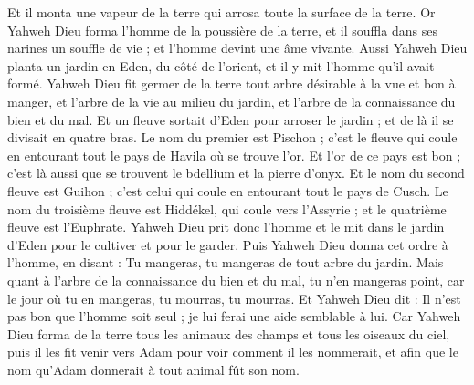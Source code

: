 \begin{multicols}{2}
Et il monta une vapeur de la terre qui arrosa toute la surface de la terre.
Or Yahweh Dieu forma l'homme de la poussière de la terre, et il souffla dans ses narines un souffle de vie ; et l'homme devint une âme vivante.
Aussi Yahweh Dieu planta un jardin en Eden, du côté de l'orient, et il y mit l'homme qu'il avait formé.
Yahweh Dieu fit germer de la terre tout arbre désirable à la vue et bon à manger, et l'arbre de la vie au milieu du jardin, et l'arbre de la connaissance du bien et du mal.
Et un fleuve sortait d'Eden pour arroser le jardin ; et de là il se divisait en quatre bras.
Le nom du premier est Pischon ; c'est le fleuve qui coule en entourant tout le pays de Havila où se trouve l'or.
Et l'or de ce pays est bon ; c'est là aussi que se trouvent le bdellium et la pierre d'onyx.
Et le nom du second fleuve est Guihon ; c'est celui qui coule en entourant tout le pays de Cusch.
Le nom du troisième fleuve est Hiddékel, qui coule vers l'Assyrie ; et le quatrième fleuve est l'Euphrate.
Yahweh Dieu prit donc l'homme et le mit dans le jardin d'Eden pour le cultiver et pour le garder.
Puis Yahweh Dieu donna cet ordre à l'homme, en disant : Tu mangeras, tu mangeras de tout arbre du jardin.
Mais quant à l'arbre de la connaissance du bien et du mal, tu n'en mangeras point, car le jour où tu en mangeras, tu mourras, tu mourras.
Et Yahweh Dieu dit : Il n'est pas bon que l'homme soit seul ; je lui ferai une aide semblable à lui.
Car Yahweh Dieu forma de la terre tous les animaux des champs et tous les oiseaux du ciel, puis il les fit venir vers Adam pour voir comment il les nommerait, et afin que le nom qu'Adam donnerait à tout animal fût son nom.

\end{multicols}
